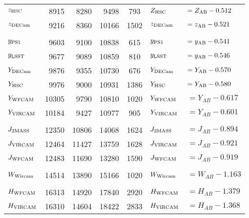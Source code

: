 \documentclass[usenatbib]{mnras}
\begin{document}
\begin{table*}
\begin{center}
\begin{tabular}{l r r r  c l l}
      $z_{\rm HSC}$        &    8915  &   	8280     &      9498	&    793      & 	$Z_{\rm HSC} $         &$    = Z_{\rm AB} - 0.512$     \\
      $z_{\rm DECam}$  &      9216   & 	 8360    &    10166   &   1502      &  $z_{\rm DECam} $     &$   = z_{\rm AB} - 0.521 $ \\
      &&&&&&\\
      $y_{\rm PS1}$       &       9603    &  9100    &    10838  &     615       &  $y_{\rm PS1}    $       &$   = y_{\rm AB} -  0.541 $ \\
      $y_{\rm LSST}$      &       9677   &	 9089    &    10859  &     810         &  $y_{\rm LSST}  $      &$    = y_{\rm AB} - 0.546 $ \\
      $Y_{\rm DECam}$   &      9876   &	  9355    &      10730   &    676      &  $Y_{\rm DECam}  $   &$  =Y_{\rm AB} - 0.570 $ \\
      $Y_{\rm HSC}$       &      9976   &    9000    & 	10931  &   1386    &  $Y_{\rm HSC}  $   &$  =Y_{\rm AB} - 0.580 $ \\
      $Y_{\rm WFCAM}$    &   10305    &   9790      &   10810   &   1020     & $Y_{\rm WFCAM}$     &$ =  Y_{AB}  - 0.617$           \\
      $Y_{\rm VIRCAM}$     &    10184    &   9427      &   10977   &    905        & $Y_{\rm VIRCAM} $     &$ = Y_{AB}  - 0.601 $          \\
      &&&&&&\\
      $J_{\rm 2MASS}$       &   12350   &       10806  & 	14068  &  1624       &  $J_{\rm 2MASS}  $     & $= J_{AB}    - 0.894  $         \\
      $J_{\rm VIRCAM} $     &   12464   &      11427   &    13759   &  1628     &  $J_{\rm VIRCAM}  $     & $= J_{AB}    - 0.921  $         \\
      $J_{\rm WFCAM} $    &    12483   &     11690  &    13280   &   1590      & $J_{\rm WFCAM}$     & $= J_{AB}    - 0.919 $          \\
      &&&&&&\\
      $W_{\rm Wircam}$   &    14514    &    13890   &    15166   &   1020    & $W_{\rm Wircam} $    & $= W_{AB}  -  1.163$           \\
      &&&&&&\\
      $H_{\rm WFCAM}$    &    16313     &    14920  &    17840   &   2920    & $H_{\rm WFCAM} $   & $= H_{AB}  - 1.379$          \\
      $H_{\rm VIRCAM}$      &    16310    &    14604   &    18422   &   2833     & $H_{\rm VIRCAM}$      & $= H_{AB}  - 1.368 $        \\

\end{tabular}
\end{center}
\end{table*}
\end{document}
